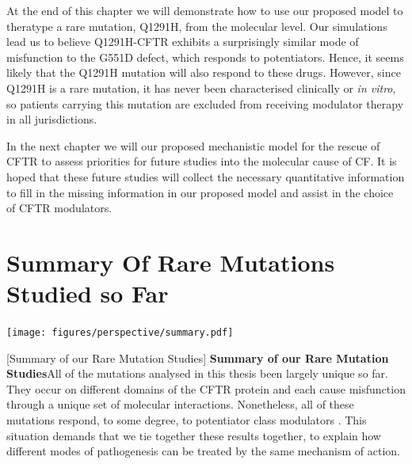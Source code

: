 At the end of this chapter we will demonstrate how to use our proposed model to theratype a rare mutation, Q1291H, from the molecular level. Our simulations lead us to believe Q1291H-CFTR exhibits a surprisingly similar mode of misfunction to the G551D defect, which responds to potentiators. Hence, it seems likely that the Q1291H mutation will also respond to these drugs. However, since Q1291H is a rare mutation, it has never been characterised clinically or \textit{in vitro}, so patients carrying this mutation are excluded from receiving modulator therapy in all jurisdictions. 

In the next chapter we will our proposed mechanistic model for the rescue of CFTR to assess priorities for future studies into the molecular cause of CF. It is hoped that these future studies will collect the necessary quantitative information to fill in the missing information in our proposed model and assist in the choice of CFTR modulators. 



\section{Summary Of Rare Mutations Studied so Far}

	\begin{center}
	  \texttt{[image: figures/perspective/summary.pdf]}
	\end{center}
\begingroup
\captionsetup{singlelinecheck = false, justification=raggedright}
[Summary of our Rare Mutation Studies] {\textbf{Summary of our Rare Mutation Studies}}{All of the mutations analysed in this thesis been largely unique so far. They occur on different domains of the CFTR protein and each cause misfunction through a unique set of molecular interactions. Nonetheless, all of these mutations respond, to some degree, to potentiator class modulators \cite{wong2022, wong2022a, kim2018, vanwilligen2019}. This situation demands that we tie together these results together, to explain how different modes of pathogenesis can be treated by the same mechanism of action. } 
\endgroup


